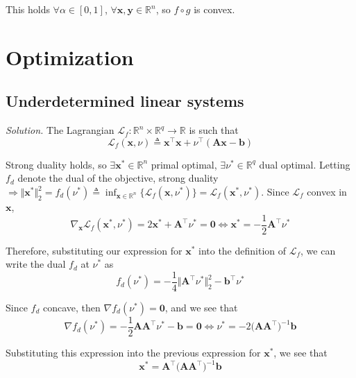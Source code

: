 \documentclass{article}
\numberwithin{equation}{section}
\begin{document}
This holds $ \forall \alpha \in [0, 1] $, $ \forall \mathbf{x}, \mathbf{y} \in
\mathbb{R}^n $, so $ f \circ g $ is convex.

\section{Optimization}

\subsection{Underdetermined linear systems}

\textit{Solution.} The Lagrangian $ \mathcal{L}_f : \mathbb{R}^n \times
\mathbb{R}^q \rightarrow \mathbb{R} $ is such that
\begin{equation*}
    \mathcal{L}_f(\mathbf{x}, \nu) \triangleq \mathbf{x}^\top\mathbf{x} +
    \nu^\top(\mathbf{Ax} - \mathbf{b})
\end{equation*}

Strong duality holds, so $ \exists \mathbf{x}^* \in \mathbb{R}^n $ primal
optimal, $ \exists \nu^* \in \mathbb{R}^q $ dual optimal. Letting $ f_d $
denote the dual of the objective, strong duality $ \Rightarrow
\Vert\mathbf{x}^*\Vert_2^2 = f_d(\nu^*) \triangleq \inf_{\mathbf{x} \in
\mathbb{R}^n}\{\mathcal{L}_f(\mathbf{x}, \nu^*)\} =
\mathcal{L}_f(\mathbf{x}^*, \nu^*) $. Since $ \mathcal{L}_f $ convex in
$ \mathbf{x} $,
\begin{equation*}
    \nabla_\mathbf{x}\mathcal{L}_f(\mathbf{x}^*, \nu^*) =
    2\mathbf{x}^* + \mathbf{A}^\top\nu^* = \mathbf{0} \Leftrightarrow
    \mathbf{x}^* = -\frac{1}{2}\mathbf{A}^\top\nu^*
\end{equation*}

Therefore, substituting our expression for $ \mathbf{x}^* $ into the
definition of $ \mathcal{L}_f $, we can write the dual $ f_d $ at $ \nu^* $ as
\begin{equation*}
    f_d(\nu^*) = -\frac{1}{4}\big\Vert\mathbf{A}^\top\nu^*\big\Vert_2^2 -
    \mathbf{b}^\top\nu^*
\end{equation*}

Since $ f_d $ concave, then $ \nabla f_d(\nu^*) = \mathbf{0} $, and we see that
\begin{equation*}
    \nabla f_d(\nu^*) = -\frac{1}{2}\mathbf{AA}^\top\nu^* - \mathbf{b} =
    \mathbf{0} \Leftrightarrow
    \nu^* = -2\big(\mathbf{AA}^\top\big)^{-1}\mathbf{b}
\end{equation*}

Substituting this expression into the previous expression for $ \mathbf{x}^* $,
we see that
\begin{equation*}
    \mathbf{x}^* = \mathbf{A}^\top\big(\mathbf{AA}^\top\big)^{-1}\mathbf{b}
\end{equation*}
\end{document}

